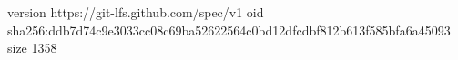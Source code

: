 version https://git-lfs.github.com/spec/v1
oid sha256:ddb7d74c9e3033cc08c69ba52622564c0bd12dfcdbf812b613f585bfa6a45093
size 1358
